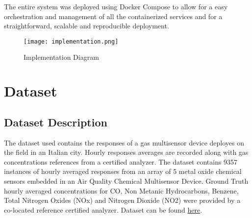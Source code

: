 The entire system was deployed using Docker Compose to allow for a easy orchestration and management of all the containerized services and for a straightforward, scalable and reproducible deployment.

\begin{figure}[!h]
    \graphicspath{ {./diagrams/} }
    \texttt{[image: implementation.png]}
    \centering
    \caption{Implementation Diagram}
    \label{fig:imple_dia}
\end{figure}

\section{Dataset}
\subsection{Dataset Description}
The dataset used contains the responses of a gas multisensor device deployes on the field in an Italian city. Hourly responses averages are recorded along with gas concentrations references from a certified analyzer. The dataset contains 9357 instances of hourly averaged responses from an array of 5 metal oxide chemical sensors embedded in an Air Quality Chemical Multisensor Device. Ground Truth hourly averaged concentrations for CO, Non Metanic Hydrocarbons, Benzene, Total Nitrogen Oxides (NOx) and Nitrogen Dioxide (NO2) were provided by a co-located reference certified analyzer. Dataset can be found \href{https://www.kaggle.com/datasets/fedesoriano/air-quality-data-set/data}{here}.

